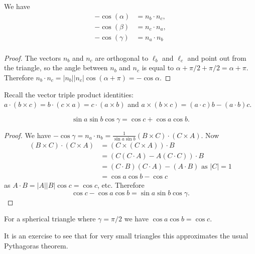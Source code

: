 \documentclass[12pt]{article}
\begin{document}
\begin{lma}
  We have
  \begin{align*}
    -\cos(\alpha)&=n_b\cdot n_c,\\
    -\cos(\beta)&=n_c\cdot n_a,\\
    -\cos(\gamma)&=n_a\cdot n_b\\
  \end{align*}
\end{lma}
\begin{proof}
The vectors $n_b$ and $n_c$ are orthogonal to $\ell_b$ and $\ell_c$ and point out from the triangle, so the angle between $n_b$ and $n_c$ is equal to $\alpha+\pi/2+\pi/2=\alpha+\pi$. Therefore $n_b\cdot n_c=|n_b||n_c|\cos(\alpha+\pi)=-\cos\alpha$.
\end{proof}

Recall the vector triple product identities: $a\cdot(b\times c)=b\cdot(c\times a)=c\cdot(a\times b)$ and $a\times (b\times c)=(a\cdot c)b-(a\cdot b)c$.

\begin{thm}
\[\sin a\sin b\cos\gamma=\cos c+\cos a\cos b.\]
\end{thm}
\begin{proof}
  We have $-\cos\gamma=n_a\cdot n_b=\frac{1}{\sin a\sin b}(B\times C)\cdot (C\times A)$. Now
  \begin{align*}
    (B\times C)\cdot (C\times A)&=(C\times(C\times A))\cdot B\\
    &=(C(C\cdot A)-A(C\cdot C))\cdot B\\
    &=(C\cdot B)(C\cdot A)-(A\cdot B)\mbox{ as }|C|=1\\
    &=\cos a\cos b-\cos c
  \end{align*}
  as $A\cdot B=|A||B|\cos c=\cos c$, etc. Therefore
  \[\cos c-\cos a\cos b=\sin a\sin b\cos\gamma.\]
\end{proof}

\begin{cor}
For a spherical triangle where $\gamma=\pi/2$ we have $\cos a\cos b=\cos c$.
\end{cor}

It is an exercise to see that for very small triangles this approximates the usual Pythagoras theorem.
\end{document}

